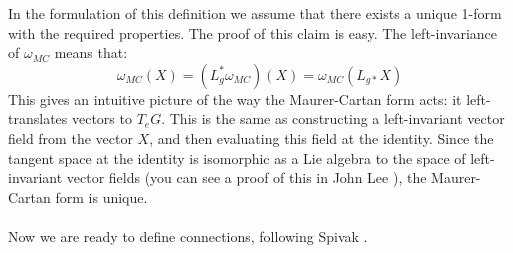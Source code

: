 \documentclass{book}
\theoremstyle{plain}
\theoremstyle{definition}
\theoremstyle{remark}
\begin{document}
In the formulation of this definition we assume that there exists a unique 1-form with the required properties. The proof of this claim is easy. The left-invariance of $\omega_{MC}$ means that:
\[    \omega_{MC} (X) =  (L_g^* \omega_{MC}) (X) = \omega_{MC} (L_{g*} X)     \]
This gives an intuitive picture of the way the Maurer-Cartan form acts: it left-translates vectors to $T_eG$. This is the same as constructing a left-invariant vector field from the vector $X$, and then evaluating this field at the identity. Since the tangent space at the identity is isomorphic as a Lie algebra to the space of left-invariant vector fields (you can see a proof of this in John Lee ), the Maurer-Cartan form is unique.
\\
\\
Now we are ready to define connections, following Spivak .
\end{document}
